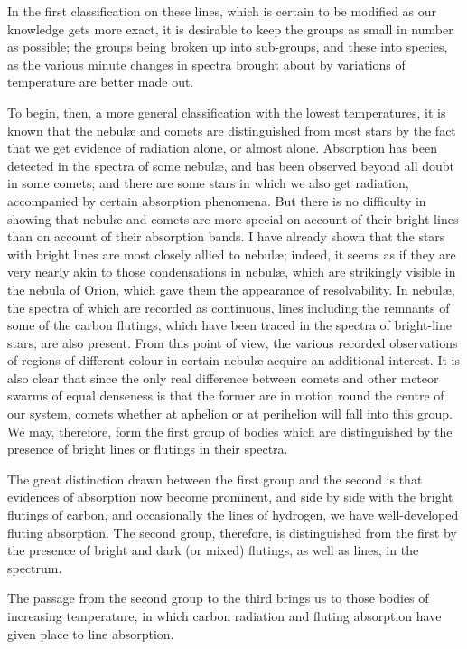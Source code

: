\documentclass[a4paper, 12pt, oneside, polutonikogreek, english]{article}
\begin{document}
In the first classification on these lines, which is certain to be modified as our knowledge gets more exact, it is desirable to keep the groups as small in number as possible; the groups being broken up into sub-groups, and these into species, as the various minute changes in spectra brought about by variations of temperature are better made out.

To begin, then, a more general classification with the lowest temperatures, it is known that the nebulæ and comets are distinguished from most stars by the fact that we get evidence of radiation alone, or almost alone. Absorption has been detected in the spectra of some nebulæ, and has been observed beyond all doubt in some comets; and there are some stars in which we also get radiation, accompanied by certain absorption phenomena. But there is no difficulty in showing that nebulæ and comets are more special on account of their bright lines than on account of their absorption bands. I have already shown that the stars with bright lines are most closely allied to nebulæ; indeed, it seems as if they are very nearly akin to those condensations in nebulæ, which are strikingly visible in the nebula of Orion, which gave them the appearance of resolvability. In nebulæ, the spectra of which are recorded as continuous, lines including the remnants of some of the carbon flutings, which have been traced in the spectra of bright-line stars, are also present. From this point of view, the various recorded observations of regions of different colour in certain nebulæ acquire an additional interest. It is also clear that since the only real difference between comets and other meteor swarms of equal denseness is that the former are in motion round the centre of our system, comets whether at aphelion or at perihelion will fall into this group. We may, therefore, form the first group of bodies which are distinguished by the presence of bright lines or flutings in their spectra.

The great distinction drawn between the first group and the second is that evidences of absorption now become prominent, and side by side with the bright flutings of carbon, and occasionally the lines of hydrogen, we have well-developed fluting absorption. The second group, therefore, is distinguished from the first by the presence of bright and dark (or mixed) flutings, as well as lines, in the spectrum.

The passage from the second group to the third brings us to those bodies of increasing temperature, in which carbon radiation and fluting absorption have given place to line absorption.
\end{document}

